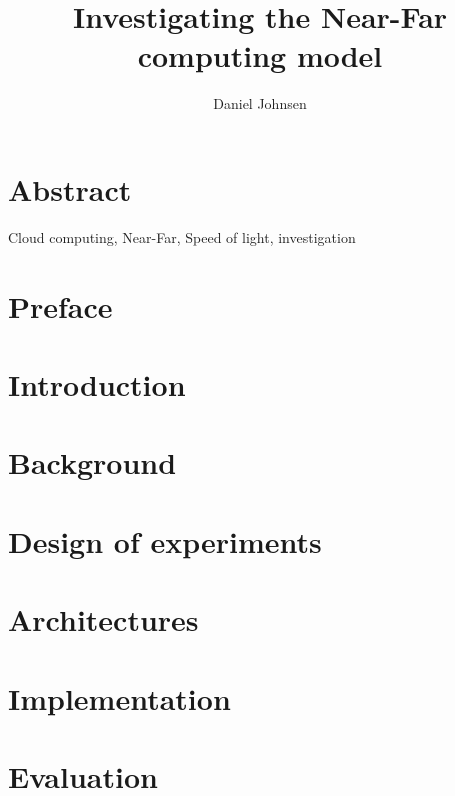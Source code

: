 \documentclass[UKenglish]{duo/ifimaster}  %
\title{Investigating the Near-Far computing model}        %
\author{Daniel Johnsen}                      %
\begin{document}
\duoforside[dept={Department of Informatics},   %
  program={Programming and System architecture},  %
  long]                                        %

\frontmatter{}
\chapter*{Abstract}
Cloud computing, Near-Far, Speed of light, investigation
\tableofcontents{}
\listoffigures{}
\listoftables{}

\chapter*{Preface}

\mainmatter{}


\chapter{Introduction}


\chapter{Background}
 


\chapter{Design of experiments}\label{chapter:design_of_experiments}




\chapter{Architectures}\label{chapter:architectures} %


\chapter{Implementation}\label{chapter:implementation}



\chapter{Evaluation}\label{chapter:evaluation}

\end{document}

